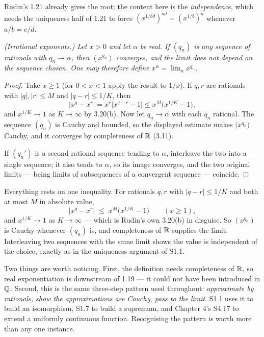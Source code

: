 \noindent
Rudin's 1.21 already gives the root; the content here is the
\emph{independence}, which needs the uniqueness half of 1.21 to force
$(x^{1/bd})^{ad} = (x^{1/b})^a$ whenever $a/b = c/d$.

\emph{(Irrational exponents.) Let $x>0$ and let $\alpha$ be real. If
$(q_n)$ is any sequence of rationals with $q_n \to \alpha$, then
$(x^{q_n})$ converges, and the limit does not depend on the sequence chosen.
One may therefore define $x^{\alpha} = \lim_n x^{q_n}$.}
\begin{proof}
Take $x \ge 1$ (for $0<x<1$ apply the result to $1/x$). If $q,r$ are
rationals with $|q|,|r| \le M$ and $|q-r| \le 1/K$, then
\[ \bigl|x^{q}-x^{r}\bigr| = x^{r}\bigl|x^{q-r}-1\bigr|
   \le x^{M}\bigl(x^{1/K}-1\bigr), \]
and $x^{1/K} \to 1$ as $K \to \infty$ by 3.20(b). Now let $q_n \to \alpha$
with each $q_n$ rational. The sequence $(q_n)$ is Cauchy and bounded, so the
displayed estimate makes $\bigl(x^{q_n}\bigr)$ Cauchy, and it converges by
completeness of $\mathbb{R}$ (3.11).

If $(q_n')$ is a second rational sequence tending to $\alpha$, interleave the
two into a single sequence; it also tends to $\alpha$, so its image
converges, and the two original limits --- being limits of subsequences of a
convergent sequence --- coincide.
\end{proof}

\begin{unpack}
Everything rests on one inequality. For rationals $q, r$ with
$|q - r| \le 1/K$ and both at most $M$ in absolute value,
\[ \bigl|x^{q} - x^{r}\bigr| \;\le\; x^{M}\bigl(x^{1/K} - 1\bigr)
   \qquad (x \ge 1), \]
and $x^{1/K} \to 1$ as $K \to \infty$ --- which is Rudin's own 3.20(b) in
disguise. So $(x^{q_n})$ is Cauchy whenever $(q_n)$ is, and completeness of
$\mathbb{R}$ supplies the limit. Interleaving two sequences with the same limit shows
the value is independent of the choice, exactly as in the uniqueness argument
of S1.1.

Two things are worth noticing. First, the definition needs completeness of
$\mathbb{R}$, so real exponentiation is downstream of 1.19 --- it could not have been
introduced in $\mathbb{Q}$. Second, this is the same three-step pattern used
throughout: \emph{approximate by rationals, show the approximations are
Cauchy, pass to the limit}. S1.1 uses it to build an isomorphism, S1.7 to
build a supremum, and Chapter 4's S4.17 to extend a uniformly continuous
function. Recognising the pattern is worth more than any one instance.
\end{unpack}
